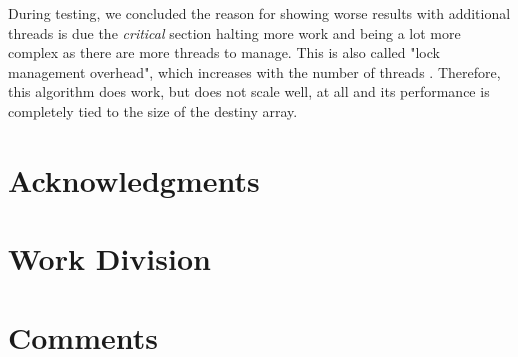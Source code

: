\documentclass[9pt,journal]{IEEEtran}
\begin{document}
During testing, we concluded the reason for showing worse results with additional threads is due the \textit{critical} section halting more work and being a lot more complex as there are more threads to manage. This is also called "lock management overhead", which increases with the number of threads \cite{lockmanage}. Therefore, this algorithm does work, but does not scale well, at all and its performance is completely tied to the size of the destiny array.

\section{Acknowledgments}


{}

\section{Work Division}

\section{Comments}
\end{document}
